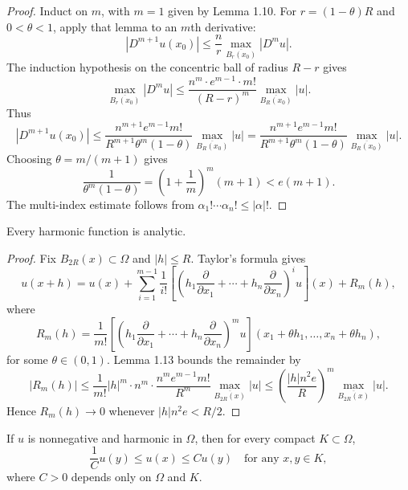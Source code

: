 \begin{proof}
\sketch Induct on $m$, with $m=1$ given by Lemma 1.10. For
$r=(1-\theta)R$ and $0<\theta<1$, apply that lemma to an $m$th derivative:
\[
|D^{m+1}u(x_0)| \le \frac{n}{r}\max_{\overline{B_r(x_0)}} |D^m u|.
\]
The induction hypothesis on the concentric ball of radius $R-r$ gives
\[
\max_{\overline{B_r(x_0)}} |D^m u| \le \frac{n^m \cdot e^{m-1} \cdot m!}{(R-r)^m}\max_{\overline{B_R(x_0)}} |u|.
\]
Thus
\[
|D^{m+1}u(x_0)| \le \frac{n^{m+1}e^{m-1}m!}{R^{m+1}\theta^m(1-\theta)}\max_{\overline{B_R(x_0)}} |u|
= \frac{n^{m+1}e^{m-1}m!}{R^{m+1}\theta^m(1-\theta)}\max_{\overline{B_R(x_0)}} |u|.
\]
Choosing $\theta=m/(m+1)$ gives
\[
\frac{1}{\theta^m(1-\theta)}=\left(1+\frac{1}{m}\right)^m(m+1)<e(m+1).
\]
The multi-index estimate follows from
$\alpha_1!\cdots\alpha_n!\le |\alpha|!$.
\end{proof}

\begin{theorem}\label{hanlin:thm-harmonic-analytic}
Every harmonic function is analytic.
\end{theorem}

\begin{proof}
\sketch Fix $B_{2R}(x)\subset\Omega$ and $|h|\le R$. Taylor's formula gives
\[
u(x+h)=u(x)+\sum_{i=1}^{m-1}\frac{1}{i!}\left[\left(h_1\frac{\partial}{\partial x_1}+\cdots+h_n\frac{\partial}{\partial x_n}\right)^i u\right](x)+R_m(h),
\]
where
\[
R_m(h)=\frac{1}{m!}\left[\left(h_1\frac{\partial}{\partial x_1}+\cdots+h_n\frac{\partial}{\partial x_n}\right)^m u\right](x_1+\theta h_1,\ldots,x_n+\theta h_n),
\]
for some $\theta\in(0,1)$. Lemma 1.13 bounds the remainder by
\[
|R_m(h)|\le \frac{1}{m!}|h|^m\cdot n^m\cdot \frac{n^m e^{m-1}m!}{R^m}\max_{\overline{B_{2R}(x)}} |u|
\le \left(\frac{|h|n^2e}{R}\right)^m \max_{\overline{B_{2R}(x)}} |u|.
\]
Hence $R_m(h)\to0$ whenever $|h|n^2e<R/2$.
\end{proof}

\begin{theorem}\label{hanlin:thm-harnack}
If $u$ is nonnegative and harmonic in $\Omega$, then for every compact
$K\subset\Omega$,
\[
\frac{1}{C}u(y)\le u(x)\le Cu(y)\quad \text{for any } x,y\in K,
\]
where $C>0$ depends only on $\Omega$ and $K$.
\end{theorem}

